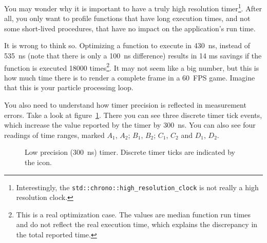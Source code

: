 \documentclass[hidelinks,titlepage,a4paper]{article}
\begin{document}
You may wonder why it is important to have a truly high resolution timer\footnote{Interestingly, the \texttt{std::chrono::high\_resolution\_clock} is not really a high resolution clock.}. After all, you only want to profile functions that have long execution times, and not some short-lived procedures, that have no impact on the application's run time.

It is wrong to think so. Optimizing a function to execute in 430~\si{\nano\second}, instead of 535~\si{\nano\second} (note that there is only a 100~\si{\nano\second} difference) results in 14 \si{\milli\second} savings if the function is executed 18000 times\footnote{This is a real optimization case. The values are median function run times and do not reflect the real execution time, which explains the discrepancy in the total reported time.}. It may not seem like a big number, but this is how much time there is to render a complete frame in a 60~FPS game. Imagine that this is your particle processing loop.

You also need to understand how timer precision is reflected in measurement errors. Take a look at figure~\ref{timer}. There you can see three discrete timer tick events, which increase the value reported by the timer by 300~\si{\nano\second}. You can also see four readings of time ranges, marked $A_1$, $A_2$; $B_1$, $B_2$; $C_1$, $C_2$ and $D_1$, $D_2$.

\begin{figure}[h]
\centering{}
\caption{Low precision (300~ns) timer. Discrete timer ticks are indicated by the \faClock{} icon.}
\label{timer}
\end{figure}
\end{document}
